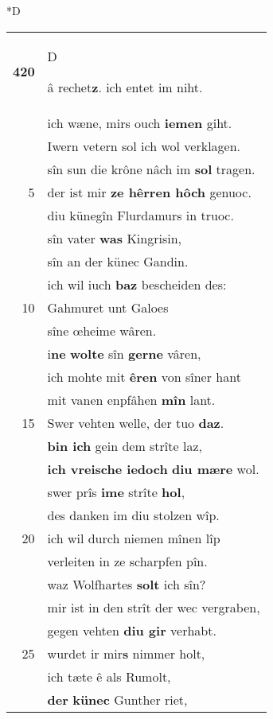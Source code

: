 \documentclass[8pt,a4paper,notitlepage]{article}
\begin{document}
\begin{table}[ht]
\begin{minipage}[t]{0.5\linewidth}
\small
\begin{center}*D
\end{center}
\begin{tabular}{rl}
\textbf{420} & \begin{large}D\end{large}â rechet\textbf{z}. ich entet im niht.\\ 
 & ich wæne, mirs ouch \textbf{iemen} giht.\\ 
 & Iwern vetern sol ich wol verklagen.\\ 
 & sîn sun die krône nâch im \textbf{sol} tragen.\\ 
5 & der ist mir \textbf{ze hêrren hôch} genuoc.\\ 
 & diu künegîn Flurdamurs in truoc.\\ 
 & sîn vater \textbf{was} Kingrisin,\\ 
 & sîn an der künec Gandin.\\ 
 & ich wil iuch \textbf{baz} bescheiden des:\\ 
10 & Gahmuret unt Galoes\\ 
 & sîne œheime wâren.\\ 
 & i\textbf{ne} \textbf{wolte} sîn \textbf{gerne} vâren,\\ 
 & ich mohte mit \textbf{êren} von sîner hant\\ 
 & mit vanen enpfâhen \textbf{mîn} lant.\\ 
15 & Swer vehten welle, der tuo \textbf{daz}.\\ 
 & \textbf{bin ich} gein dem strîte laz,\\ 
 & \textbf{ich vreische iedoch} \textbf{diu mære} wol.\\ 
 & swer prîs \textbf{ime} strîte \textbf{hol},\\ 
 & des danken im diu stolzen wîp.\\ 
20 & ich wil durch niemen mînen lîp\\ 
 & verleiten in ze scharpfen pîn.\\ 
 & waz Wolfhartes \textbf{solt} ich sîn?\\ 
 & mir ist in den strît der wec vergraben,\\ 
 & gegen vehten \textbf{diu gir} verhabt.\\ 
25 & wurdet ir mir\textbf{s} nimmer holt,\\ 
 & ich tæte ê als Rumolt,\\ 
 & \textbf{der} \textbf{künec} Gunther riet,\\ 

\end{tabular}
\end{minipage}
\end{table}
\end{document}
